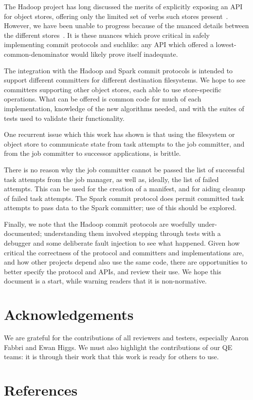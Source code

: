 \documentclass[format=acmsmall, screen=true, review=false]{acmart}
\begin{document}
The Hadoop project has long discussed the merits of explicitly
exposing an API for object stores, offering only the limited
set of verbs such stores present\ \cite{HADOOP-9565}.
However, we have been unable to progress because of the nuanced details
between the different stores\ \cite{S3, WASB, ADL, GCS}.
It is these nuances which prove critical in safely implementing
commit protocols and suchlike: any API which offered a lowest-common-denominator
would likely prove itself inadequate.

The integration with the Hadoop and Spark commit protocols is intended
to support different committers for different destination filesystems.
We hope to see committers supporting other object stores, each
able to use store-specific operations.
What can be offered is common code for much of each implementation,
knowledge of the new algorithms needed, and
with the suites of tests used to validate their functionality.

One recurrent issue which this work has shown is that using the
filesystem or object store to communicate state from task attempts
to the job committer, and from the job committer to successor
applications, is brittle.

There is no reason why the job committer cannot be passed the list of
successful task attempts from the job manager, as well as, ideally,
the list of failed attempts.
This can be used for the creation of a manifest, and for aiding cleanup
of failed task attempts.
The Spark commit protocol does permit committed task attempts to pass data
to the Spark committer;
use of this should be explored.


Finally, we note that the Hadoop commit protocols are woefully under-documented;
understanding them involved stepping through tests with a debugger and
some deliberate fault injection to see what happened.
Given how critical the correctness of the protocol and committers and implementations
are, and how other projects depend also use the same code, there
are opportunities to better specify the protocol and APIs, and review
their use.
We hope this document is a start, while warning readers that it is non-normative.


\section*{Acknowledgements}
\label{sec:acknowledgements}

We are grateful for the contributions of all reviewers and testers, especially
Aaron Fabbri and Ewan Higgs.
We must also highlight the contributions of our QE teams: it is through
their work that this work is ready for others to use.


\section{References}
\label{sec:references}




\end{document}

